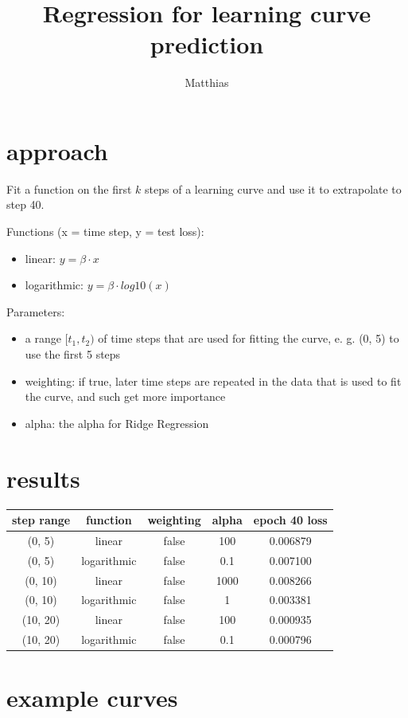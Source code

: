\documentclass[a4paper,10pt]{article}
\title{Regression for learning curve prediction}
\author{Matthias}
\begin{document}
\maketitle

\section{approach}

Fit a function on the first $k$ steps of a learning curve and use it to extrapolate to step 40.

Functions (x = time step, y = test loss):
\begin{itemize}
 \item linear: $y = \beta \cdot x$
 \item logarithmic: $y = \beta \cdot log10(x)$
\end{itemize}

Parameters:
\begin{itemize}
 \item a range $[t_1, t_2)$ of time steps that are used for fitting the curve, e. g. (0, 5) to use the first 5 steps
 \item weighting: if true, later time steps are repeated in the data that is used to fit the curve, and such get more importance
 \item alpha: the alpha for Ridge Regression
\end{itemize}


\section{results}

\begin{tabular}{|c|c|c|c|c|}
 \hline
 step range & function & weighting & alpha & epoch 40 loss \\
 \hline
 (0, 5) & linear & false & 100 & 0.006879 \\
 (0, 5) & logarithmic & false & 0.1 & 0.007100 \\
 (0, 10) & linear & false & 1000 & 0.008266 \\
 (0, 10) & logarithmic & false & 1 & 0.003381 \\
 (10, 20) & linear & false & 100 & 0.000935 \\
 (10, 20) & logarithmic & false & 0.1 & 0.000796 \\
 \hline
\end{tabular}


\section{example curves}
\end{document}
